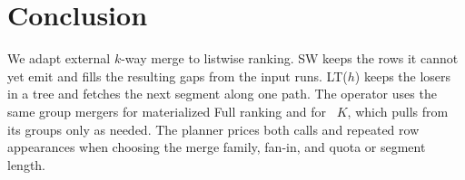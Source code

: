 \section{Conclusion}
\label{sec:conclusion}
We adapt external $k$-way merge to listwise ranking. SW keeps the rows it cannot yet emit and fills the resulting gaps from the input runs. LT($h$) keeps the losers in a tree and fetches the next segment along one path. The operator uses the same group mergers for materialized Full ranking and for \LIMIT~$K$, which pulls from its groups only as needed. The planner prices both calls and repeated row appearances when choosing the merge family, fan-in, and quota or segment length.

